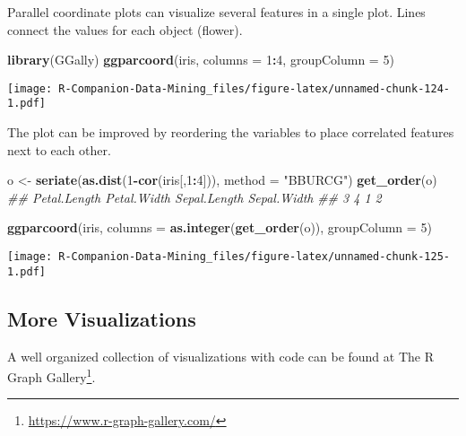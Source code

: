 \documentclass[
  notitlepage]{book}
\newenvironment{Shaded}{\begin{snugshade}}{\end{snugshade}}
\newcommand{\CommentTok}[1]{\textcolor[rgb]{0.56,0.35,0.01}{\textit{#1}}}
\newcommand{\DataTypeTok}[1]{\textcolor[rgb]{0.13,0.29,0.53}{#1}}
\newcommand{\DecValTok}[1]{\textcolor[rgb]{0.00,0.00,0.81}{#1}}
\newcommand{\KeywordTok}[1]{\textcolor[rgb]{0.13,0.29,0.53}{\textbf{#1}}}
\newcommand{\NormalTok}[1]{#1}
\newcommand{\OperatorTok}[1]{\textcolor[rgb]{0.81,0.36,0.00}{\textbf{#1}}}
\newcommand{\StringTok}[1]{\textcolor[rgb]{0.31,0.60,0.02}{#1}}
\DeclareRobustCommand{\href}[2]{#2\footnote{\url{#1}}}
\begin{document}
Parallel coordinate plots can visualize several features in a single
plot. Lines connect the values for each object (flower).

\begin{Shaded}
\begin{Highlighting}[]
\KeywordTok{library}\NormalTok{(GGally)}
\KeywordTok{ggparcoord}\NormalTok{(iris, }\DataTypeTok{columns =} \DecValTok{1}\OperatorTok{:}\DecValTok{4}\NormalTok{, }\DataTypeTok{groupColumn =} \DecValTok{5}\NormalTok{)}
\end{Highlighting}
\end{Shaded}

\texttt{[image: R-Companion-Data-Mining\_files/figure-latex/unnamed-chunk-124-1.pdf]}

The plot can be improved by reordering the variables to place correlated
features next to each other.

\begin{Shaded}
\begin{Highlighting}[]
\NormalTok{o \textless{}{-}}\StringTok{ }\KeywordTok{seriate}\NormalTok{(}\KeywordTok{as.dist}\NormalTok{(}\DecValTok{1}\OperatorTok{{-}}\KeywordTok{cor}\NormalTok{(iris[,}\DecValTok{1}\OperatorTok{:}\DecValTok{4}\NormalTok{])), }\DataTypeTok{method =} \StringTok{"BBURCG"}\NormalTok{)}
\KeywordTok{get\_order}\NormalTok{(o)}
\CommentTok{\#\# Petal.Length  Petal.Width Sepal.Length  Sepal.Width }
\CommentTok{\#\#            3            4            1            2}
\end{Highlighting}
\end{Shaded}

\begin{Shaded}
\begin{Highlighting}[]
\KeywordTok{ggparcoord}\NormalTok{(iris, }
           \DataTypeTok{columns =} \KeywordTok{as.integer}\NormalTok{(}\KeywordTok{get\_order}\NormalTok{(o)), }
           \DataTypeTok{groupColumn =} \DecValTok{5}\NormalTok{)}
\end{Highlighting}
\end{Shaded}

\texttt{[image: R-Companion-Data-Mining\_files/figure-latex/unnamed-chunk-125-1.pdf]}

\hypertarget{more-visualizations}{%
\subsection{More Visualizations}\label{more-visualizations}}

A well organized collection of visualizations with code can be found at
\href{https://www.r-graph-gallery.com/}{The R Graph Gallery}.
\end{document}

